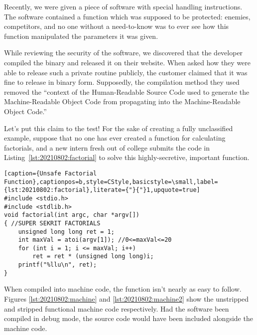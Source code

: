 Recently, we were given a piece of software with special handling instructions. The software contained a function which was supposed to be protected: enemies, competitors, and no one without a need-to-know was to ever see how this function manipulated the parameters it was given.

While reviewing the security of the software, we discovered that the developer compiled the binary and released it on their website. When asked how they were able to release such a private routine publicly, the customer claimed that it was fine to release in binary form. Supposedly, the compilation method they used removed the ``context of the Human-Readable Source Code used to generate the Machine-Readable Object Code from propagating into the Machine-Readable Object Code.''

Let's put this claim to the test! For the sake of creating a fully unclassified example, suppose that no one has ever created a function for calculating factorials, and a new intern fresh out of college submits the code in Listing~\ref{lst:20210802:factorial} to solve this highly-secretive, important function.
\begin{lstlisting}[caption={Unsafe Factorial Function},captionpos=b,style=CStyle,basicstyle=\small,label={lst:20210802:factorial},literate={"}{"}1,upquote=true]
#include <stdio.h>
#include <stdlib.h>
void factorial(int argc, char *argv[])
{ //SUPER SEKRIT FACTORIALS
	unsigned long long ret = 1;
	int maxVal = atoi(argv[1]); //0<=maxVal<=20
	for (int i = 1; i <= maxVal; i++)
		ret = ret * (unsigned long long)i;
	printf("%llu\n", ret);
}
\end{lstlisting}

When compiled into machine code, the function isn't nearly as easy to follow. Figures \ref{lst:20210802:machine} and \ref{lst:20210802:machine2} show the unstripped and stripped functional machine code respectively. Had the software been compiled in debug mode, the source code would have been included alongside the machine code.

